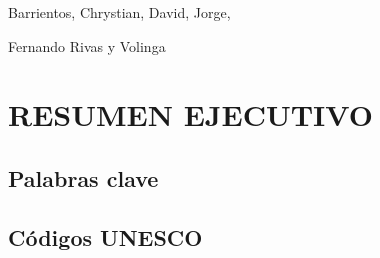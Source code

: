 \documentclass[a4paper, 12pt, spanish, twoside]{article}
\newcommand\blankpage{%
    \null
    \thispagestyle{empty}%
    \newpage}
\begin{document}
Barrientos,
Chrystian,
David,
Jorge,

Fernando Rivas y Volinga

\clearpage
\afterpage{\blankpage} %





\newpage
\section*{RESUMEN EJECUTIVO} %



\subsection*{Palabras clave} %

\subsection*{Códigos UNESCO}
\end{document}
